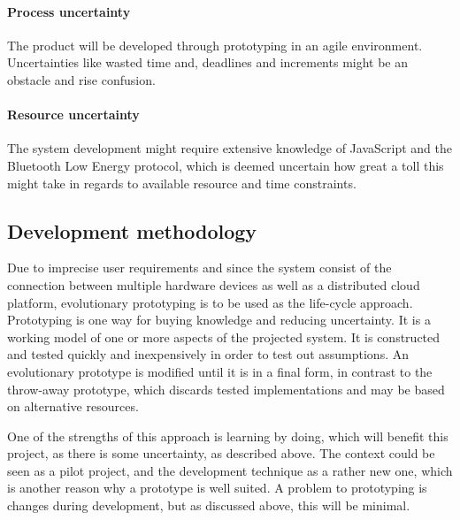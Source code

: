 \paragraph{Process uncertainty} The product will be developed through prototyping in an agile environment. Uncertainties like wasted time and, deadlines and increments might be an obstacle and rise confusion.

\paragraph{Resource uncertainty} The system development might require extensive knowledge of JavaScript and the Bluetooth Low Energy protocol, which is deemed uncertain how great a toll this might take in regards to available resource and time constraints.

\subsection{Development methodology}
Due to imprecise user requirements and since the system consist of the connection between multiple hardware devices as well as a distributed cloud platform, evolutionary prototyping is to be used as the life-cycle approach. Prototyping is one way for buying knowledge and reducing uncertainty. It is a working model of one or more aspects of the projected system. It is constructed and tested quickly and inexpensively in order to test out assumptions. An evolutionary prototype is modified until it is in a final form, in contrast to the throw-away prototype, which discards tested implementations and may be based on alternative resources. 

One of the strengths of this approach is learning by doing, which will benefit this project, as there is some uncertainty, as described above. The context could be seen as a pilot project, and the development technique as a rather new one, which is another reason why a prototype is well suited. A problem to prototyping is changes during development, but as discussed above, this will be minimal.



